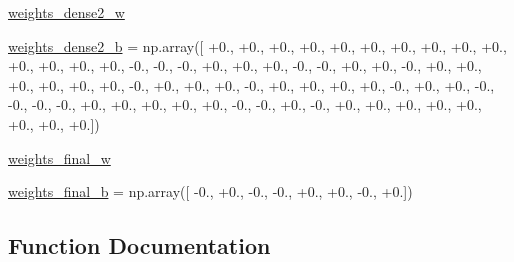 \begin{DoxyCompactItemize}
\item 
\hyperlink{namespacepybullet-gym_1_1pybulletgym_1_1examples_1_1roboschool-weights_1_1enjoy___t_f___ant_py_bullet_env__v0__2017may_a083f178caff0715a9171efc73a6ea7bd}{weights\+\_\+dense2\+\_\+w}
\item 
\hyperlink{namespacepybullet-gym_1_1pybulletgym_1_1examples_1_1roboschool-weights_1_1enjoy___t_f___ant_py_bullet_env__v0__2017may_a4f5dc29f7bdb1570a2e4c5d09c4980d1}{weights\+\_\+dense2\+\_\+b} = np.\+array(\mbox{[} +0., +0., +0., +0., +0., +0., +0., +0., +0., +0., +0., +0., +0., +0., -\/0., -\/0., -\/0., +0., +0., +0., -\/0., -\/0., +0., +0., -\/0., +0., +0., +0., +0., +0., +0., -\/0., +0., +0., +0., -\/0., +0., +0., +0., +0., -\/0., +0., +0., -\/0., -\/0., -\/0., -\/0., +0., +0., +0., +0., +0., -\/0., -\/0., +0., -\/0., +0., +0., +0., +0., +0., +0., +0., +0.\mbox{]})
\item 
\hyperlink{namespacepybullet-gym_1_1pybulletgym_1_1examples_1_1roboschool-weights_1_1enjoy___t_f___ant_py_bullet_env__v0__2017may_ac73076555ecee977e1bb51374f8beaf2}{weights\+\_\+final\+\_\+w}
\item 
\hyperlink{namespacepybullet-gym_1_1pybulletgym_1_1examples_1_1roboschool-weights_1_1enjoy___t_f___ant_py_bullet_env__v0__2017may_a72c6f48c90760cf15bf281fbdd0e4267}{weights\+\_\+final\+\_\+b} = np.\+array(\mbox{[} -\/0., +0., -\/0., -\/0., +0., +0., -\/0., +0.\mbox{]})
\end{DoxyCompactItemize}


\subsection{Function Documentation}
